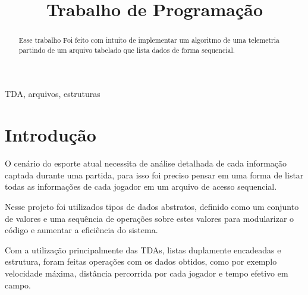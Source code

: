 \documentclass[conference]{IEEEtran}
\begin{document}
\title{Trabalho de Programação}
\author{
}
\maketitle
\begin{abstract}

Esse trabalho Foi feito com intuito de implementar um algoritmo de uma telemetria partindo de um arquivo tabelado que lista dados de forma sequencial.

\end{abstract}

\begin{IEEEkeywords}
TDA, arquivos, estruturas
\end{IEEEkeywords}

\section{Introdução}

O cenário do esporte atual necessita de análise detalhada de cada informação captada durante uma partida, para isso foi preciso pensar em uma forma de listar todas as informações de cada jogador em um arquivo de acesso sequencial.

Nesse projeto foi utilizados tipos de dados abstratos, definido como  um conjunto de valores e uma sequência de operações sobre estes valores\cite{b1} para modularizar o código e aumentar a eficiência do sistema.

Com a utilização principalmente das TDAs, listas duplamente encadeadas e estrutura,  foram feitas operações com os dados obtidos, como por exemplo velocidade máxima, distância percorrida por cada jogador e tempo efetivo em campo. 
\end{document}
